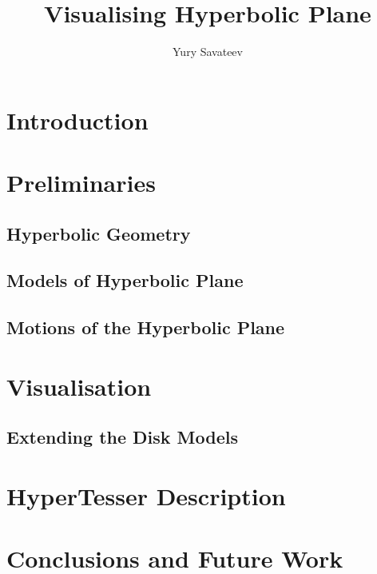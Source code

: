 \documentclass{llncs}
\title{Visualising Hyperbolic Plane}
\author{Yury Savateev}
\institute{University of Hertfordshire}
\begin{document}
\maketitle


\section{Introduction}
\section{Preliminaries}
\subsection{Hyperbolic Geometry}
\subsection{Models of Hyperbolic Plane}
\subsection{Motions of the Hyperbolic Plane}
\section{Visualisation}
\subsection{Extending the Disk Models}
\section{HyperTesser Description}
\section{Conclusions and Future Work}







\end{document}
